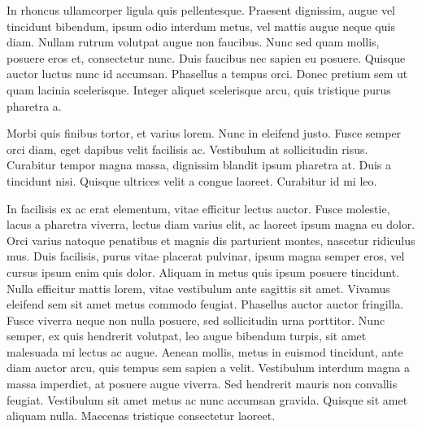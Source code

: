 In rhoncus ullamcorper ligula quis pellentesque. Praesent dignissim, augue vel tincidunt bibendum, ipsum odio interdum metus, vel mattis augue neque quis diam. Nullam rutrum volutpat augue non faucibus. Nunc sed quam mollis, posuere eros et, consectetur nunc. Duis faucibus nec sapien eu posuere. Quisque auctor luctus nunc id accumsan. Phasellus a tempus orci. Donec pretium sem ut quam lacinia scelerisque. Integer aliquet scelerisque arcu, quis tristique purus pharetra a.

Morbi quis finibus tortor, et varius lorem. Nunc in eleifend justo. Fusce semper orci diam, eget dapibus velit facilisis ac. Vestibulum at sollicitudin risus. Curabitur tempor magna massa, dignissim blandit ipsum pharetra at. Duis a tincidunt nisi. Quisque ultrices velit a congue laoreet. Curabitur id mi leo.

In facilisis ex ac erat elementum, vitae efficitur lectus auctor. Fusce molestie, lacus a pharetra viverra, lectus diam varius elit, ac laoreet ipsum magna eu dolor. Orci varius natoque penatibus et magnis dis parturient montes, nascetur ridiculus mus. Duis facilisis, purus vitae placerat pulvinar, ipsum magna semper eros, vel cursus ipsum enim quis dolor. Aliquam in metus quis ipsum posuere tincidunt. Nulla efficitur mattis lorem, vitae vestibulum ante sagittis sit amet. Vivamus eleifend sem sit amet metus commodo feugiat. Phasellus auctor auctor fringilla. Fusce viverra neque non nulla posuere, sed sollicitudin urna porttitor. Nunc semper, ex quis hendrerit volutpat, leo augue bibendum turpis, sit amet malesuada mi lectus ac augue. Aenean mollis, metus in euismod tincidunt, ante diam auctor arcu, quis tempus sem sapien a velit. Vestibulum interdum magna a massa imperdiet, at posuere augue viverra. Sed hendrerit mauris non convallis feugiat. Vestibulum sit amet metus ac nunc accumsan gravida. Quisque sit amet aliquam nulla. Maecenas tristique consectetur laoreet.